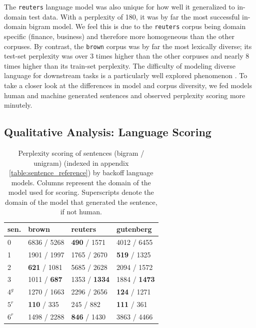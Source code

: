 \documentclass[11pt,a4paper]{article}
\begin{document}

The \texttt{reuters} language model was also unique for how well it generalized to in-domain test data. With a perplexity of 180, it was by far the
most successful in-domain bigram model. We feel this is due to the \texttt{reuters} corpus being domain specific (finance, business) and therefore more
homogeneous than the other corpuses. By contrast, the \texttt{brown} corpus was by far the most lexically diverse; its test-set perplexity was over 
3 times higher than the other corpuses and nearly 8 times higher than its train-set perplexity. The difficulty of modeling diverse language for 
downstream tasks is a particularly well explored phenomenon \cite{ponte1998language}. To take a closer look at the differences in model and corpus diversity,
we fed models human and machine generated sentences and observed perplexity scoring more minutely.




\subsection{Qualitative Analysis: Language Scoring}
\label{sub:out_domain_text_analysis_qualitative}



\begin{table}
\begin{tabular}{llll}
\hline
sen. & brown       & reuters     & gutenberg   \\
\hline
  0 & 6836 / 5268 & \textbf{ 490 } / 1571  & 4012 / 6455 \\
  1 & 1901 / 1997 & 1765 / 2670 & \textbf{ 519 } / 1325  \\
  2 & \textbf{ 621 } / 1081  & 5685 / 2628 & 2094 / 1572 \\
  3 & 1011 / \textbf{ 687 }  & 1353 / \textbf{ 1334 } & 1884 / \textbf{ 1473 } \\
  $4^g$ & 1270 / 1663 & 2296 / 2656 & \textbf{ 124 } / 1271   \\
  $5^r$ & \textbf{ 110 } / 335   & 245  / 882   & \textbf{ 111 } / 361   \\
  $6^r$ & 1498 / 2288 & \textbf{ 846 } / 1430  & 3863 / 4466 \\
\hline
\end{tabular}
\caption{Perplexity scoring of sentences (bigram / unigram) (indexed in appendix \ref{table:sentence_reference}) by
  backoff language models. Columns represent the domain of the model used for scoring.
Superscripts denote the domain of the model that generated the sentence, if not human.}
\label{table:sentence_scoring}
\vspace{-15pt}
\end{table}
\end{document}
